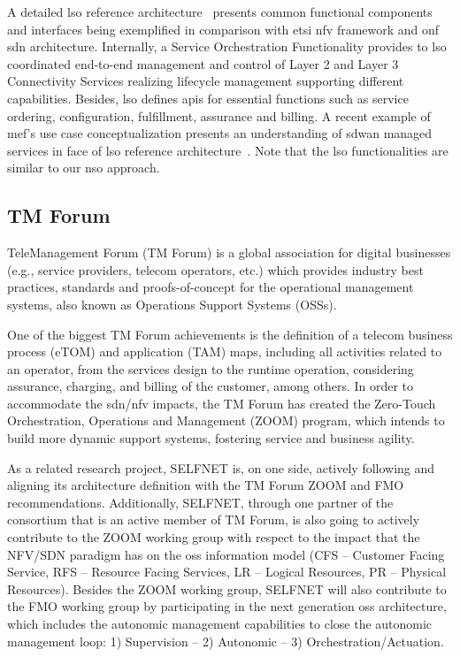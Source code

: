 A detailed \gls{lso} reference architecture~\cite{MEF:LSO:2016} presents common functional components and interfaces being exemplified in comparison with \gls{etsi} \gls{nfv} framework and \gls{onf} \gls{sdn} architecture. Internally, a Service Orchestration Functionality provides to \gls{lso} coordinated end-to-end management and control of Layer 2 and Layer 3 Connectivity Services realizing lifecycle management supporting different capabilities.
Besides, \gls{lso} defines \glspl{api} for essential functions such as service ordering, configuration, fulfillment, assurance and billing. A recent example of \gls{mef}'s use case conceptualization presents an understanding of \gls{sdwan} managed services in face of \gls{lso} reference architecture~\cite{MEF:SDWAN:2017}. Note that the \gls{lso} functionalities are similar to our \gls{nso} approach.


\subsection{TM Forum}
TeleManagement Forum (TM Forum) is a global association for
digital businesses (e.g., service providers, telecom operators, etc.) which provides industry best practices, standards and proofs-of-concept for the operational management systems, also known as Operations Support Systems (OSSs). 

One of the biggest TM Forum achievements is the definition of a telecom business process (eTOM) and application (TAM) maps, including all activities related to an operator, from the services design to the runtime operation, considering assurance, charging, and billing of the customer, among others. In order to accommodate the \gls{sdn}/\gls{nfv} impacts, the TM Forum has created the Zero-Touch Orchestration, Operations and Management (ZOOM) program, which intends to build more dynamic support systems, fostering service and business agility.

As a related research project, SELFNET is, on one side, actively following and aligning its architecture definition with the TM Forum ZOOM and FMO recommendations. Additionally, SELFNET, through one partner of the consortium that is an active member of TM Forum, is also going to actively contribute to the ZOOM working group with respect to the impact that the NFV/SDN paradigm has on the \gls{oss} information model (CFS – Customer Facing Service, RFS – Resource Facing Services, LR – Logical Resources, PR – Physical Resources). Besides the ZOOM working group, SELFNET will also contribute to the FMO working group by participating in the next generation \gls{oss} architecture, which includes the autonomic management capabilities to close the autonomic management loop: 1) Supervision – 2) Autonomic – 3) Orchestration/Actuation.

